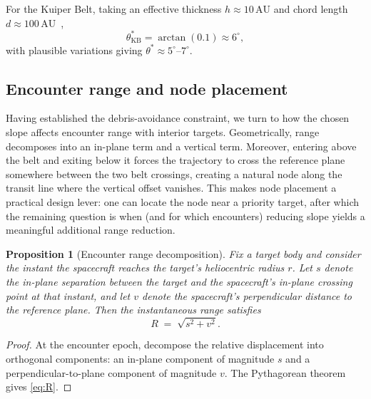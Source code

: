 \documentclass{article}
\newtheorem{proposition}{Proposition}
\begin{document}
For the Kuiper Belt, taking an effective thickness $h \approx 10\,\mathrm{AU}$ and chord length $d \approx 100\,\mathrm{AU}$~\cite{petit2011canada,bannister2018ossos},
\begin{equation}
\theta^*_{\mathrm{KB}} = \arctan(0.1) \approx 6^\circ,
\label{eq:kuiper_slope}
\end{equation}
with plausible variations giving $\theta^*\approx 5^\circ$--$7^\circ$.

\subsection{Encounter range and node placement}
\label{sec:node_placement}

Having established the debris-avoidance constraint, we turn to how the chosen slope affects encounter range with interior targets. Geometrically, range decomposes into an in-plane term and a vertical term. Moreover, entering above the belt and exiting below it forces the trajectory to cross the reference plane somewhere between the two belt crossings, creating a natural node along the transit line where the vertical offset vanishes. This makes node placement a practical design lever: one can locate the node near a priority target, after which the remaining question is when (and for which encounters) reducing slope yields a meaningful additional range reduction.

\begin{proposition}[Encounter range decomposition]
\label{prop:range}
Fix a target body and consider the instant the spacecraft reaches the target's heliocentric radius $r$. Let $s$ denote the in-plane separation between the target and the spacecraft's in-plane crossing point at that instant, and let $v$ denote the spacecraft's perpendicular distance to the reference plane. Then the instantaneous range satisfies
\begin{equation}
R \;=\; \sqrt{s^2 + v^2}.
\label{eq:R}
\end{equation}
\end{proposition}

\begin{proof}
At the encounter epoch, decompose the relative displacement into orthogonal components: an in-plane component of magnitude $s$ and a perpendicular-to-plane component of magnitude $v$. The Pythagorean theorem gives \eqref{eq:R}.
\end{proof}
\end{document}

